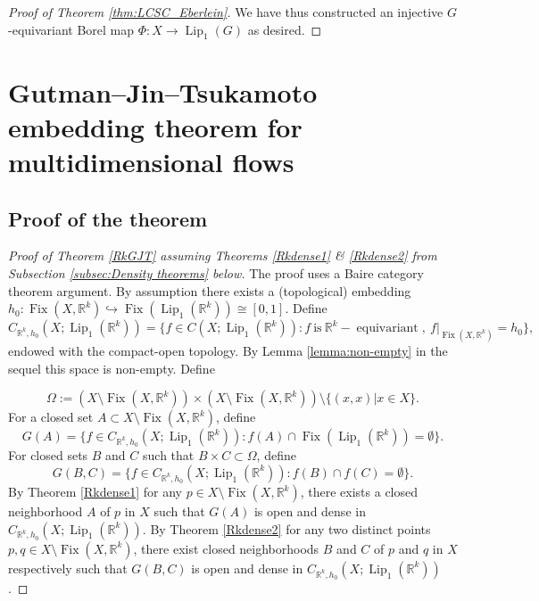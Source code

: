 \documentclass[11pt]{article}
\theoremstyle{plain}
\theoremstyle{definition}
\DeclareMathOperator{\Lip}{Lip}
\DeclareMathOperator{\Fix}{Fix}
\DeclareMathOperator{\equi}{equivariant}
\def\Rk{\mathbb{R}^k}
\numberwithin{figure}{section}
\begin{document}
\begin{proof}[Proof of Theorem \ref{thm:LCSC_Eberlein}]
   \noindent  
   We have thus constructed an injective $G$-equivariant Borel map $\Phi:X\to\Lip_1(G)$ as desired.
\end{proof}
    

    
\section{Gutman--Jin--Tsukamoto embedding theorem for multidimensional flows}\label{BK}

\subsection{Proof of the theorem}

\begin{proof}[Proof of Theorem \ref{RkGJT} assuming Theorems \ref{Rkdense1} \& \ref{Rkdense2} from Subsection \ref{subsec:Density theorems} below]

The proof uses a Baire category theorem argument. By assumption there exists a (topological) embedding $h_0:\Fix(X,\Rk)\hookrightarrow\Fix(\Lip_{1}(\Rk))\cong[0,1]$. Define 
\begin{equation*}
    C_{\Rk,h_0}(X;\Lip_{1}(\Rk))=\{f\in C(X;\Lip_{1}(\Rk)): f~\text{is}~\Rk-\equi,~f|_{\Fix(X,\Rk)}=h_0\},
\end{equation*}   
endowed with the compact-open topology. By Lemma \ref{lemma:non-empty} in the sequel this space is non-empty. Define

\begin{equation*}
       \Omega:=(X\setminus\Fix(X,\Rk))\times(X\setminus\Fix(X,\Rk))\setminus\{(x,x)| x\in X\}. 
    \end{equation*}
     For a closed set $A\subset X\setminus\Fix(X,\Rk)$, define
\begin{equation}\label{G(A)}
    G(A)=\{f\in C_{\Rk,h_0}(X;\Lip_{1}(\Rk)): f(A)\cap\Fix(\Lip_{1}(\Rk))=\emptyset\}.
\end{equation}
For closed sets $B$ and $C$ such that $B\times C \subset \Omega$, define
   \begin{equation}\label{G(B,C)}
    G(B,C)=\{f\in C_{\Rk,h_0}(X;\Lip_{1}(\Rk)): f(B)\cap f(C)=\emptyset\}.
\end{equation}
     By Theorem \ref{Rkdense1}  for any $p\in X\setminus\Fix(X,\Rk)$, there exists a closed neighborhood $A$ of $p$ in $X$ such that $G(A)$
is open and dense in $C_{\Rk,h_0}(X;\Lip_{1}(\Rk))$. By  Theorem  \ref{Rkdense2}  for any two distinct points $p,q\in X\setminus\Fix(X,\Rk)$, there exist closed neighborhoods $B$ and $C$ of $p$ and $q$ in $X$ respectively such that $G(B,C)$
is open and dense in $C_{\Rk,h_0}(X;\Lip_{1}(\Rk))$.
     

\end{proof}
\end{document}

